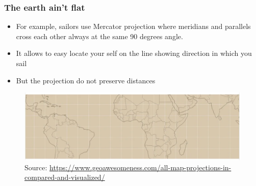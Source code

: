 \documentclass[
  shownotes,
  xcolor={svgnames},
  hyperref={colorlinks,citecolor=DarkBlue,linkcolor=andesred,urlcolor=DarkBlue}
  , aspectratio=169]{beamer}
\begin{document}
\begin{frame}[fragile]
\frametitle{The earth ain't flat}
\begin{itemize}
  \footnotesize
  \item For example, sailors use Mercator projection where meridians and parallels cross each other always at the same 90 degrees angle.
  \medskip
  \item It allows to easy locate your self on the line showing direction in which you sail
  \medskip
  \item But the projection do not preserve  distances
\end{itemize}
 


\begin{figure}[H] \centering
            \captionsetup{justification=centering}
        \includegraphics[scale=0.3]{figures/Mercator}
        \\
        \tiny
        Source: \url{https://www.geoawesomeness.com/all-map-projections-in-compared-and-visualized/}
 \end{figure}


\end{frame}
\end{document}
